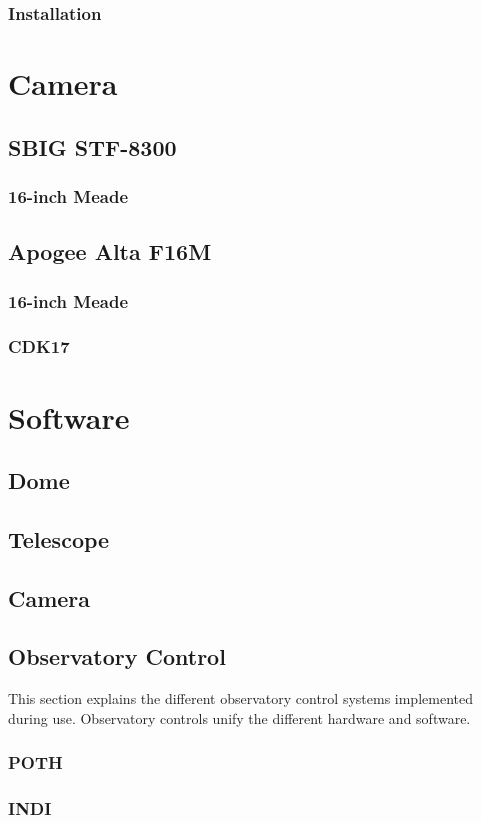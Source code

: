 \subsubsection{Installation}


\section{Camera}
\subsection{SBIG STF-8300}
\subsubsection{16-inch Meade}

\subsection{Apogee Alta F16M}
\subsubsection{16-inch Meade}
\subsubsection{CDK17}

\section{Software}
\subsection{Dome}
\subsection{Telescope}
\subsection{Camera}
\subsection{Observatory Control}
This section explains the different observatory control systems implemented during use.
Observatory controls unify the different hardware and software. 
\subsubsection{POTH}
\subsubsection{INDI}
